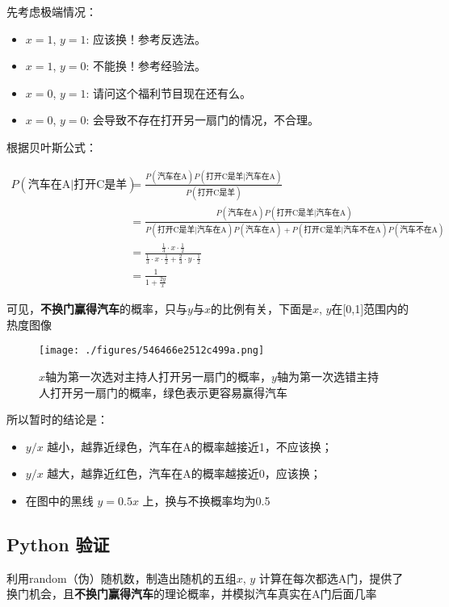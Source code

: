 先考虑极端情况：

\begin{itemize}
\item $x = 1$, $y = 1$: 应该换！参考反选法。
\item $x = 1$, $y = 0$: 不能换！参考经验法。
\item $x = 0$, $y = 1$: 请问这个福利节目现在还有么。
\item $x = 0$, $y = 0$: 会导致不存在打开另一扇门的情况，不合理。
\end{itemize}

根据贝叶斯公式：

\begin{align}
\nonumber
P(\text{汽车在A}|\text{打开C是羊})&=\frac{P(\text{汽车在A})P(\text{打开C是羊}|\text{汽车在A})}{P(\text{打开C是羊})}\\
\nonumber
&=\frac{P(\text{汽车在A})P(\text{打开C是羊}|\text{汽车在A})}{P(\text{打开C是羊}|\text{汽车在A})P(\text{汽车在A})+P(\text{打开C是羊}|\text{汽车不在A})P(\text{汽车不在A})}\\
\nonumber
&=\frac{\frac{1}{3}\cdot x\cdot \frac{1}{2}}{\frac{1}{3}\cdot x\cdot \frac{1}{2}+\frac{2}{3}\cdot y\cdot \frac{1}{2}}\\
\nonumber
&=\frac{1}{1+\frac{2y}{x}}
\end{align}

可见，\textbf{不换门赢得汽车}的概率，只与$y$与$x$的比例有关，下面是$x$, $y$在[0,1]范围内的热度图像

\begin{figure}[ht]
\centering
\texttt{[image: ./figures/546466e2512c499a.png]}
\caption{$x$轴为第一次选对主持人打开另一扇门的概率，$y$轴为第一次选错主持人打开另一扇门的概率，绿色表示更容易赢得汽车} \label {fig_MontyH}
\end{figure}

所以暂时的结论是：

\begin{itemize}
\item $y/x$ 越小，越靠近绿色，汽车在A的概率越接近1，不应该换；
\item $y/x$ 越大，越靠近红色，汽车在A的概率越接近0，应该换；
\item 在图中的黑线 $y=0.5x$ 上，换与不换概率均为0.5
\end{itemize}

\subsection{Python 验证}
利用random（伪）随机数，制造出随机的五组$x$, $y$ 计算在每次都选A门，提供了换门机会，且\textbf{不换门赢得汽车}的理论概率，并模拟汽车真实在A门后面几率

